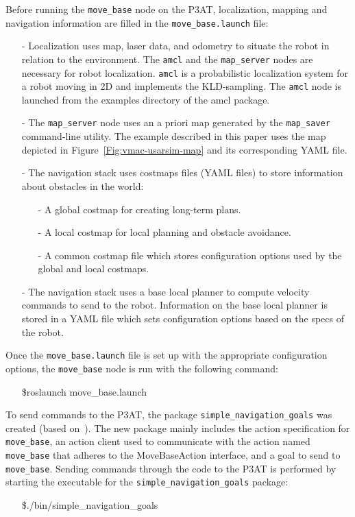 Before running the \texttt{move\_base} node on the P3AT, localization, mapping and navigation information are filled in the \texttt{move\_base.launch} file:
\begin{itemize}
 \item [-] Localization uses map, laser data, and odometry to situate the robot in relation to the environment. The \texttt{amcl} and the \texttt{map\_server} nodes are necessary for robot localization. \texttt{amcl} is a probabilistic localization system for a robot moving in 2D and implements the KLD-sampling\cite{DIETER.IJRS.2003}. The \texttt{amcl} node is launched from the examples directory of the amcl package.
\item [-] The \texttt{map\_server} node uses an a priori map generated by the \texttt{map\_saver} command-line utility. The example described in this paper uses the map depicted in Figure~\ref{Fig:vmac-usarsim-map} and its corresponding YAML file.
\item [-] The navigation stack uses costmaps files (YAML files) to store information about obstacles in the world:
\begin{itemize}
\item [-] A global costmap for creating long-term plans.
\item [-] A local costmap for local planning and obstacle avoidance.
\item [-] A common costmap file which stores configuration options used by the global and local costmaps.
\end{itemize}
\item [-] The navigation stack uses a base local planner to compute velocity commands to send to the robot. Information on the base local planner is stored in a YAML file which sets configuration options based on the specs of the robot.
\end{itemize}

Once the \texttt{move\_base.launch} file is set up with the appropriate configuration options, the \texttt{move\_base} node is run with the following command:

\begin{itemize}
\item[]\$roslaunch move\_base.launch
\end{itemize}

To send commands to the P3AT, the package \texttt{simple\_navigation\_goals} was created (based on~\cite{SendingSimpleGoals}). The new package mainly includes the action specification for \texttt{move\_base},  an action client used to communicate with the action named \texttt{move\_base} that adheres to the MoveBaseAction interface, and a goal to send to \texttt{move\_base}. Sending commands through the code to the P3AT is performed by starting the executable for the \texttt{simple\_navigation\_goals} package:

\begin{itemize}
\item[]\$./bin/simple\_navigation\_goals
\end{itemize}
